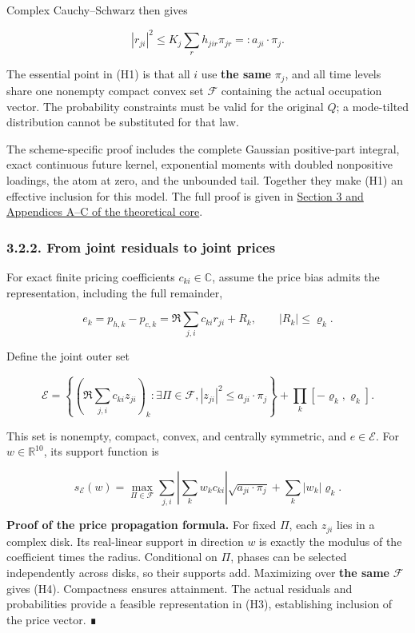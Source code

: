\documentclass[a4paper,11pt]{article}
\begin{document}
Complex Cauchy–Schwarz then gives

\[
|r_{ji}|^2\le
K_j\sum_r h_{jir}\pi_{jr}=:a_{ji}\cdot\pi_j.
\tag{H1}
\]

The essential point in (H1) is that all $i$ use \textbf{the same} $\pi_j$, and all time levels share one nonempty compact convex set \(\mathcal F\) containing the actual occupation vector. The probability constraints must be valid for the original $Q$; a mode-tilted distribution cannot be substituted for that law.

The scheme-specific proof includes the complete Gaussian positive-part integral, exact continuous future kernel, exponential moments with doubled nonpositive loadings, the atom at zero, and the unbounded tail. Together they make (H1) an effective inclusion for this model. The full proof is given in \href{../docs/classical-evidence.md}{Section 3 and Appendices A–C of the theoretical core}.

\subsubsection*{3.2.2. From joint residuals to joint prices}

For exact finite pricing coefficients $c_{ki}\in\mathbb C$, assume the price bias admits the representation, including the full remainder,

\[
e_k=p_{h,k}-p_{c,k}
=\Re\sum_{j,i}c_{ki}r_{ji}+R_k,
\qquad |R_k|\le\varrho_k.
\tag{H2}
\]

Define the joint outer set

\[
\mathcal E=
\left\{\left(\Re\sum_{j,i}c_{ki}z_{ji}\right)_k:
\exists\Pi\in\mathcal F,
|z_{ji}|^2\le a_{ji}\cdot\pi_j\right\}
+\prod_k[-\varrho_k,\varrho_k].
\tag{H3}
\]

This set is nonempty, compact, convex, and centrally symmetric, and $e\in\mathcal E$. For $w\in\mathbb R^{10}$, its support function is

\[
s_{\mathcal E}(w)=
\max_{\Pi\in\mathcal F}
\sum_{j,i}\left|\sum_kw_kc_{ki}\right|
\sqrt{a_{ji}\cdot\pi_j}
+\sum_k|w_k|\varrho_k.
\tag{H4}
\]

\textbf{Proof of the price propagation formula.} For fixed $\Pi$, each $z_{ji}$ lies in a complex disk. Its real-linear support in direction $w$ is exactly the modulus of the coefficient times the radius. Conditional on $\Pi$, phases can be selected independently across disks, so their supports add. Maximizing over \textbf{the same} $\mathcal F$ gives (H4). Compactness ensures attainment. The actual residuals and probabilities provide a feasible representation in (H3), establishing inclusion of the price vector. ∎
\end{document}
